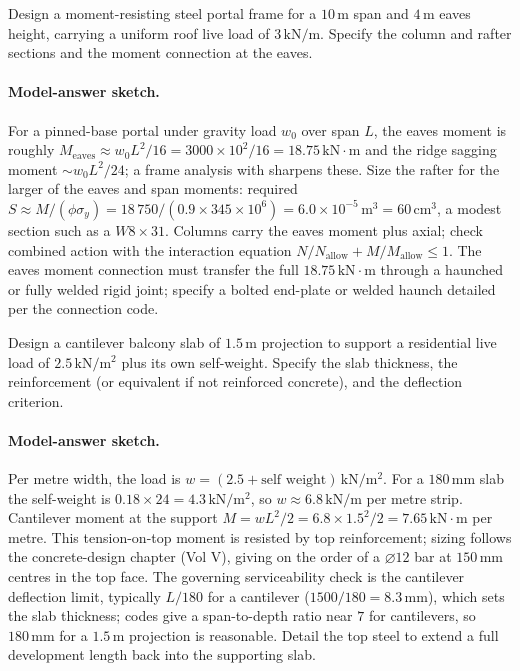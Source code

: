 \begin{exercise}
Design a moment-resisting steel portal frame for a $10\,\si{\meter}$
span and $4\,\si{\meter}$ eaves height, carrying a uniform roof
live load of $3\,\text{kN}/\text{m}$. Specify the column and rafter
sections and the moment connection at the eaves.

\paragraph{Model-answer sketch.} For a pinned-base portal under gravity
load $w_0$ over span $L$, the eaves moment is roughly $M_{\text{eaves}}
\approx w_0L^2/16 = 3000\times 10^2/16 = 18.75\,\text{kN}\cdot\text{m}$
and the ridge sagging moment $\sim w_0L^2/24$; a frame analysis with
 sharpens these. Size the rafter for the
larger of the eaves and span moments: required $S \approx M/(\phi\sigma_y)
= 18\,750/(0.9\times 345\times 10^6) = 6.0\times 10^{-5}\,\si{\meter
\cubed} = 60\,\text{cm}^3$, a modest section such as a $W8\times 31$.
Columns carry the eaves moment plus axial; check combined action with
the interaction equation $N/N_{\text{allow}} + M/M_{\text{allow}} \leq
1$. The eaves moment connection must transfer the full $18.75\,\text{kN}
\cdot\text{m}$ through a haunched or fully welded rigid joint; specify a
bolted end-plate or welded haunch detailed per the connection code.
\end{exercise}

\begin{exercise}
Design a cantilever balcony slab of $1.5\,\si{\meter}$ projection
to support a residential live load of $2.5\,\text{kN}/\text{m}^2$
plus its own self-weight. Specify the slab thickness, the
reinforcement (or equivalent if not reinforced concrete), and the
deflection criterion.

\paragraph{Model-answer sketch.} Per metre width, the load is $w =
(2.5 + \text{self weight})\,\text{kN}/\text{m}^2$. For a $180\,\si{
\milli\meter}$ slab the self-weight is $0.18\times 24 = 4.3\,\text{kN}/
\text{m}^2$, so $w \approx 6.8\,\text{kN}/\text{m}$ per metre strip.
Cantilever moment at the support $M = wL^2/2 = 6.8\times 1.5^2/2 =
7.65\,\text{kN}\cdot\text{m}$ per metre. This tension-on-top moment is
resisted by top reinforcement; sizing follows the concrete-design
chapter (Vol V), giving on the order of a $\varnothing12$ bar at
$150\,\si{\milli\meter}$ centres in the top face. The governing
serviceability check is the cantilever deflection limit, typically
$L/180$ for a cantilever ($1500/180 = 8.3\,\si{\milli\meter}$), which
sets the slab thickness; codes give a span-to-depth ratio near $7$ for
cantilevers, so $180\,\si{\milli\meter}$ for a $1.5\,\si{\meter}$
projection is reasonable. Detail the top steel to extend a full
development length back into the supporting slab.
\end{exercise}

